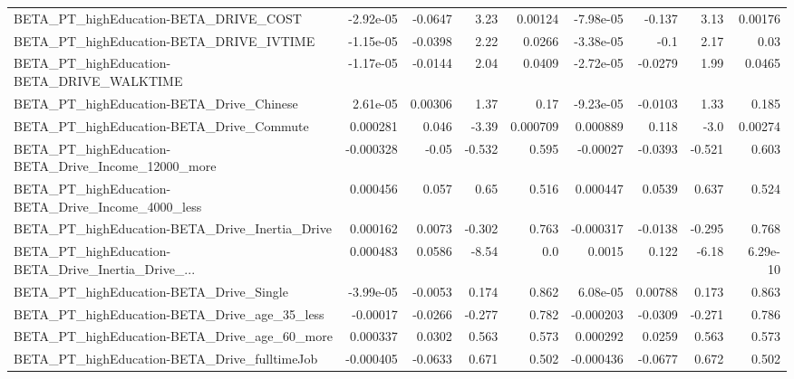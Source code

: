 \begin{tabular}{lrrrrrrrr}
BETA\_PT\_highEducation-BETA\_DRIVE\_COST              &   -2.92e-05 &      -0.0647 &     3.23 &  0.00124 &  -7.98e-05 &      -0.137 &         3.13 &       0.00176 \\
BETA\_PT\_highEducation-BETA\_DRIVE\_IVTIME            &   -1.15e-05 &      -0.0398 &     2.22 &   0.0266 &  -3.38e-05 &        -0.1 &         2.17 &          0.03 \\
BETA\_PT\_highEducation-BETA\_DRIVE\_WALKTIME          &   -1.17e-05 &      -0.0144 &     2.04 &   0.0409 &  -2.72e-05 &     -0.0279 &         1.99 &        0.0465 \\
BETA\_PT\_highEducation-BETA\_Drive\_Chinese           &    2.61e-05 &      0.00306 &     1.37 &     0.17 &  -9.23e-05 &     -0.0103 &         1.33 &         0.185 \\
BETA\_PT\_highEducation-BETA\_Drive\_Commute           &    0.000281 &        0.046 &    -3.39 & 0.000709 &   0.000889 &       0.118 &         -3.0 &       0.00274 \\
BETA\_PT\_highEducation-BETA\_Drive\_Income\_12000\_more &   -0.000328 &        -0.05 &   -0.532 &    0.595 &   -0.00027 &     -0.0393 &       -0.521 &         0.603 \\
BETA\_PT\_highEducation-BETA\_Drive\_Income\_4000\_less  &    0.000456 &        0.057 &     0.65 &    0.516 &   0.000447 &      0.0539 &        0.637 &         0.524 \\
BETA\_PT\_highEducation-BETA\_Drive\_Inertia\_Drive     &    0.000162 &       0.0073 &   -0.302 &    0.763 &  -0.000317 &     -0.0138 &       -0.295 &         0.768 \\
BETA\_PT\_highEducation-BETA\_Drive\_Inertia\_Drive\_... &    0.000483 &       0.0586 &    -8.54 &      0.0 &     0.0015 &       0.122 &        -6.18 &      6.29e-10 \\
BETA\_PT\_highEducation-BETA\_Drive\_Single            &   -3.99e-05 &      -0.0053 &    0.174 &    0.862 &   6.08e-05 &     0.00788 &        0.173 &         0.863 \\
BETA\_PT\_highEducation-BETA\_Drive\_age\_35\_less       &    -0.00017 &      -0.0266 &   -0.277 &    0.782 &  -0.000203 &     -0.0309 &       -0.271 &         0.786 \\
BETA\_PT\_highEducation-BETA\_Drive\_age\_60\_more       &    0.000337 &       0.0302 &    0.563 &    0.573 &   0.000292 &      0.0259 &        0.563 &         0.573 \\
BETA\_PT\_highEducation-BETA\_Drive\_fulltimeJob       &   -0.000405 &      -0.0633 &    0.671 &    0.502 &  -0.000436 &     -0.0677 &        0.672 &         0.502 \\

\end{tabular}
